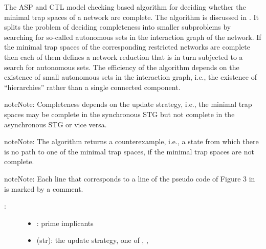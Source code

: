 \documentclass[letterpaper,10pt,english]{sphinxmanual}
\begin{document}
\begin{fulllineitems}
\label{\detokenize{Attractors:PyBoolNet.Attractors.completeness}}
The ASP and CTL model checking based algorithm for deciding whether the minimal trap spaces of a network are complete.
The algorithm is discussed in {\hyperref[\detokenize{Bibliography:klarner2015trap}]{}}.
It splits the problem of deciding completeness into smaller subproblems by searching for so-called autonomous sets in the
interaction graph of the network.
If the minimal trap spaces of the corresponding restricted networks are complete
then each of them defines a network reduction that is in turn subjected to a search for autonomous sets.
The efficiency of the algorithm depends on the existence of small autonomous sets in the interaction graph, i.e.,
the existence of “hierarchies” rather than a single connected component.

\begin{sphinxadmonition}{note}{Note:}
Completeness depends on the update strategy, i.e.,
the minimal trap spaces may be complete in the synchronous STG but not complete in the asynchronous STG or vice versa.
\end{sphinxadmonition}

\begin{sphinxadmonition}{note}{Note:}
The algorithm returns a counterexample, i.e., a state from which there is no path to one of the minimal trap spaces,
if the minimal trap spaces are not complete.
\end{sphinxadmonition}

\begin{sphinxadmonition}{note}{Note:}
Each line that corresponds to a line of the pseudo code of Figure 3 in {\hyperref[\detokenize{Bibliography:klarner2015trap}]{}} is marked by a comment.
\end{sphinxadmonition}
\begin{description}
\item[{:}] \leavevmode\begin{itemize}
\item {} 
: prime implicants

\item {} 
 (str): the update strategy, one of , , 


\end{itemize}
\end{description}
\end{fulllineitems}
\end{document}
